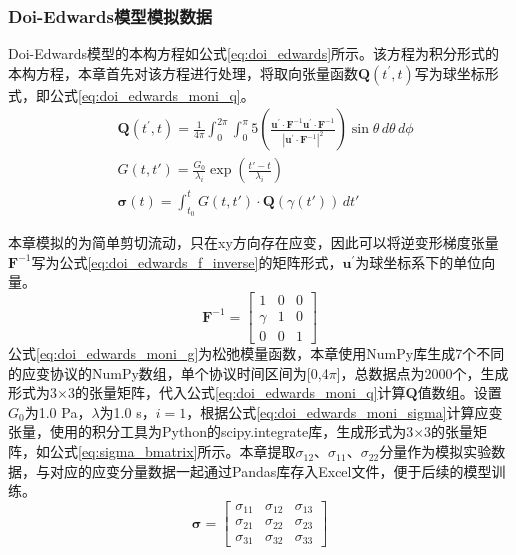 \subsubsection{Doi-Edwards模型模拟数据}
Doi-Edwards模型的本构方程如公式\eqref{eq:doi_edwards}所示。该方程为积分形式的本构方程，本章首先对该方程进行处理，将取向张量函数$\mathbf{Q}(t^{\prime},t)$写为球坐标形式，即公式\eqref{eq:doi_edwards_moni_q}。
\begin{align}
   & \mathbf{Q}(t^{\prime},t) = \frac{1}{4\pi} \int_{0}^{2\pi} \int_{0}^{\pi} 5 \left( \frac{\mathbf{u}^{\prime} \cdot \mathbf{F}^{-1} \mathbf{u}^{\prime} \cdot \mathbf{F}^{-1}}{|\mathbf{u}^{\prime} \cdot \mathbf{F}^{-1}|^{2}} \right) \sin\theta \, d\theta \, d\phi   \label{eq:doi_edwards_moni_q} \\
   & G(t, t') = \frac{G_0}{\lambda_i} \exp\left( \frac{t' - t}{\lambda_i} \right)   \label{eq:doi_edwards_moni_g}                                                                                                                                                                                         \\
   & \boldsymbol{\sigma}(t) = \int_{t_0}^t G(t, t') \cdot \mathbf{Q}(\gamma(t')) \, dt' \label{eq:doi_edwards_moni_sigma}
\end{align}

本章模拟的为简单剪切流动，只在xy方向存在应变，因此可以将逆变形梯度张量$\mathbf{F}^{-1}$写为公式\eqref{eq:doi_edwards_f_inverse}的矩阵形式，$\mathbf{u}^{\prime}$为球坐标系下的单位向量。
\begin{equation}
  \mathbf{F}^{-1} = \begin{bmatrix}
    1      & 0 & 0 \\
    \gamma & 1 & 0 \\
    0      & 0 & 1
  \end{bmatrix} \label{eq:doi_edwards_f_inverse}
\end{equation}
公式\eqref{eq:doi_edwards_moni_g}为松弛模量函数，本章使用NumPy库生成7个不同的应变协议的NumPy数组，单个协议时间区间为[0,4$\pi$]，总数据点为2000个，生成形式为3$\times$3的张量矩阵，代入公式\eqref{eq:doi_edwards_moni_q}计算$\mathbf{Q}$值数组。设置$G_0$为1.0 Pa，$\lambda$为1.0 s，$i=1$，根据公式\eqref{eq:doi_edwards_moni_sigma}计算应变张量，使用的积分工具为Python的scipy.integrate库，生成形式为3$\times$3的张量矩阵，如公式\eqref{eq:sigma_bmatrix}所示。本章提取$
  \sigma_{12}$、$\sigma_{11}$、$\sigma_{22}$分量作为模拟实验数据，与对应的应变分量数据一起通过Pandas库存入Excel文件，便于后续的模型训练。
\begin{equation}
  \boldsymbol{\sigma} = \begin{bmatrix}
    \sigma_{11} & \sigma_{12} & \sigma_{13} \\
    \sigma_{21} & \sigma_{22} & \sigma_{23} \\
    \sigma_{31} & \sigma_{32} & \sigma_{33}
  \end{bmatrix} \label{eq:sigma_bmatrix}
\end{equation}

